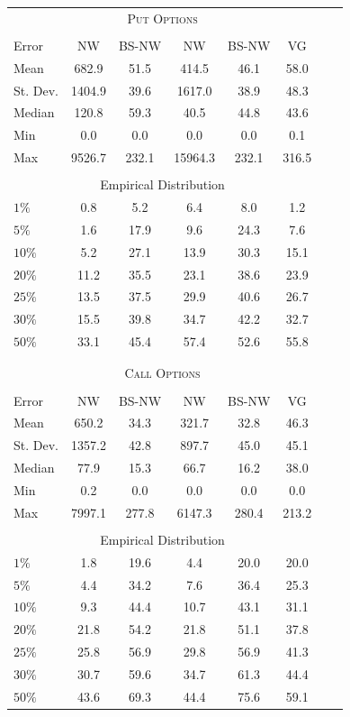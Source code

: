 \begin{center} 
 \begin{tabular*}{\textwidth}{@{\extracolsep{\fill}}lccccccc} 
 \toprule 
 \multicolumn{6}{c}{\textsc{Put Options}}\\ 
 \multicolumn{6}{c}{}\\  
Error & NW & BS-NW & NW\raisebox{-.4ex}{\tiny CV} & BS-NW\raisebox{-.4ex}{\tiny CV} & VG \\  
 \midrule 
Mean       & 682.9& 51.5& 414.5& 46.1& 58.0\\ 
St. Dev.   & 1404.9& 39.6& 1617.0& 38.9& 48.3\\ 
Median     & 120.8& 59.3& 40.5& 44.8& 43.6\\ 
Min        & 0.0& 0.0& 0.0& 0.0& 0.1\\ 
Max        & 9526.7& 232.1& 15964.3& 232.1& 316.5\\ 
 \multicolumn{6}{c}{}\\ 
 \multicolumn{6}{c}{Empirical Distribution}\\ 
 \midrule 
$1\%$      & 0.8& 5.2& 6.4& 8.0& 1.2\\ 
$5\%$      & 1.6& 17.9& 9.6& 24.3& 7.6\\ 
$10\%$     & 5.2& 27.1& 13.9& 30.3& 15.1\\ 
$20\%$     & 11.2& 35.5& 23.1& 38.6& 23.9\\ 
$25\%$     & 13.5& 37.5& 29.9& 40.6& 26.7\\ 
$30\%$     & 15.5& 39.8& 34.7& 42.2& 32.7\\ 
$50\%$     & 33.1& 45.4& 57.4& 52.6& 55.8\\ 
 \multicolumn{6}{c}{}\\ 
 \multicolumn{6}{c}{}\\ 
 \toprule 
 \multicolumn{6}{c}{\textsc{Call Options}}\\ 
 \multicolumn{6}{c}{}\\ 
Error & NW & BS-NW & NW\raisebox{-.4ex}{\tiny CV} & BS-NW\raisebox{-.4ex}{\tiny CV} & VG \\  
 \midrule 
Mean       & 650.2& 34.3& 321.7& 32.8& 46.3\\ 
St. Dev.   & 1357.2& 42.8& 897.7& 45.0& 45.1\\ 
Median     & 77.9& 15.3& 66.7& 16.2& 38.0\\ 
Min        & 0.2& 0.0& 0.0& 0.0& 0.0\\ 
Max        & 7997.1& 277.8& 6147.3& 280.4& 213.2\\ 
 \multicolumn{6}{c}{}\\ 
 \multicolumn{6}{c}{Empirical Distribution}\\ 
 \midrule 
$1\%$      & 1.8& 19.6& 4.4& 20.0& 20.0\\ 
$5\%$      & 4.4& 34.2& 7.6& 36.4& 25.3\\ 
$10\%$     & 9.3& 44.4& 10.7& 43.1& 31.1\\ 
$20\%$     & 21.8& 54.2& 21.8& 51.1& 37.8\\ 
$25\%$     & 25.8& 56.9& 29.8& 56.9& 41.3\\ 
$30\%$     & 30.7& 59.6& 34.7& 61.3& 44.4\\ 
$50\%$     & 43.6& 69.3& 44.4& 75.6& 59.1\\ 
\bottomrule 
\end{tabular*} 
\end{center}
